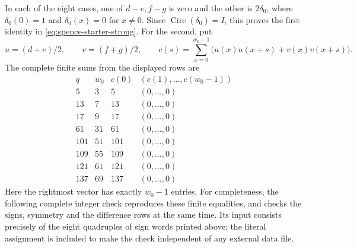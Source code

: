 \documentclass[10pt]{article}
\begin{document}
In each of the eight cases, one of $d-e,f-g$ is zero and the other is
$2\delta_0$, where $\delta_0(0)=1$ and $\delta_0(x)=0$ for $x\ne0$.
Since $\operatorname{Circ}(\delta_0)=I$, this proves the first identity in
\eqref{eq:spence-starter-strong}. For the second, put
\[
 u=(d+e)/2,\qquad v=(f+g)/2,\qquad
 c(s)=\sum_{x=0}^{w_0-1}\bigl(u(x)u(x+s)+v(x)v(x+s)\bigr).
\]
The complete finite sums from the displayed rows are
\[
\begin{array}{c|r|r|c}
 q&w_0&c(0)&(c(1),\ldots,c(w_0-1))\\\hline
 5&3&5&(0,\ldots,0)\\
 13&7&13&(0,\ldots,0)\\
 17&9&17&(0,\ldots,0)\\
 61&31&61&(0,\ldots,0)\\
 101&51&101&(0,\ldots,0)\\
 109&55&109&(0,\ldots,0)\\
 121&61&121&(0,\ldots,0)\\
 137&69&137&(0,\ldots,0)
\end{array}
\]
Here the rightmost vector has exactly $w_0-1$ entries. For completeness,
the following complete integer check reproduces these finite equalities,
and checks the signs, symmetry and the difference rows at the same time.
Its input consists precisely of the eight quadruples of sign words printed above;
the literal assignment is included to make the check independent of any
external data file.
\end{document}

